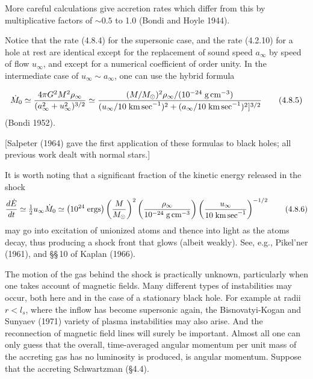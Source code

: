 More careful calculations give accretion rates which differ from this by multiplicative factors of $\sim 0.5$ to 1.0 (Bondi and Hoyle 1944).

Notice that the rate (4.8.4) for the supersonic case, and the rate
(4.2.10) for a hole at rest are identical except for the replacement of sound
speed $a_\infty$ by speed of flow $u_\infty$, and except for a numerical coefficient of order
unity. In the intermediate case of $u_\infty \sim a_\infty$, one can use the hybrid formula

\begin{equation}
\dot{M}_0 \simeq \frac{4\pi G^2 M^2 \rho_\infty}{(a_\infty^2 + u_\infty^2)^{3/2}}
\simeq \frac{(M/M_\odot)^2 \rho_\infty / (10^{-24}\;\text{g\,cm}^{-3})}
{(u_\infty / 10\;\text{km\,sec}^{-1})^2 + (a_\infty / 10\;\text{km\,sec}^{-1})^2]^{3/2}} \tag{4.8.5}
\end{equation}
(Bondi 1952).

[Salpeter (1964) gave the first application of these formulas to black holes; all
previous work dealt with normal stars.]

It is worth noting that a significant fraction of the kinetic energy released in
the shock
\begin{equation}
\frac{d\dot{E}}{dt} \simeq \tfrac{1}{2} u_\infty \dot{M}_0
\simeq \left(10^{24}\;\text{ergs}\right)
\left(\frac{M}{M_\odot}\right)^2
\left(\frac{\rho_\infty}{10^{-24}\;\text{g\,cm}^{-3}}\right)
\left(\frac{u_\infty}{10\;\text{km\,sec}^{-1}}\right)^{-1/2} \tag{4.8.6}
\end{equation}
may go into excitation of unionized atoms and thence into light as the atoms
decay, thus producing a shock front that glows (albeit weakly). See, e.g.,
Pikel'ner (1961), and \S\S\,10 of Kaplan (1966).

The motion of the gas behind the shock is practically unknown, particularly
when one takes account of magnetic fields. Many different types of instabilities
may occur, both here and in the case of a stationary black hole. For example at
radii $r < l_s$, where the inflow has become supersonic again, the Bisnovatyi-Kogan and
Sunyaev (1971) variety of plasma instabilities may also arise. And the reconnection
of magnetic field lines will surely be important. Almost all one can only guess that
the overall, time-averaged angular momentum per unit mass of the accreting
gas has no luminosity is produced, is angular momentum. Suppose that the accreting
Schwartzman (\S4.4).


